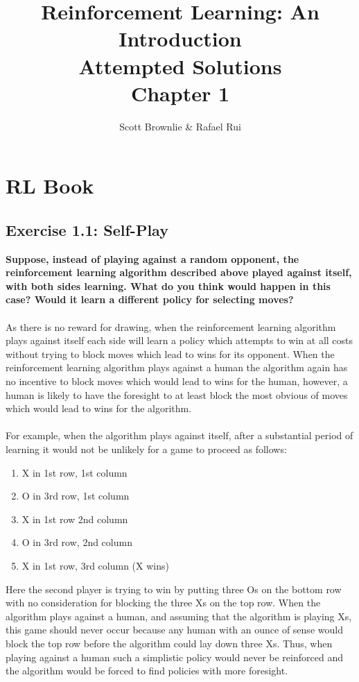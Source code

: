 \documentclass[a4paper,11pt]{article}
\title{Reinforcement Learning: An Introduction \\ Attempted Solutions \\ Chapter 1}
\author{Scott Brownlie \& Rafael Rui}
\date{}
\numberwithin{equation}{section}
\theoremstyle{remark}
\begin{document}
\maketitle

\section{RL Book}

\subsection{Exercise 1.1: Self-Play}

\textbf{Suppose, instead of playing against a random opponent, the reinforcement learning algorithm described above played against itself, with both sides learning. What do you think would happen in this case? Would it learn a different policy for selecting moves?}
\\ \\
As there is no reward for drawing, when the reinforcement learning algorithm plays against itself each side will learn a policy which attempts to win at all costs without trying to block moves which lead to wins for its opponent. When the reinforcement learning algorithm plays against a human the algorithm again has no incentive to block moves which would lead to wins for the human, however, a human is likely to have the foresight to at least block the most obvious of moves which would lead to wins for the algorithm. 
\\ \\
For example, when the algorithm plays against itself, after a substantial period of learning it would not be unlikely for a game to proceed as follows: 
\begin{enumerate}
	\item X in 1st row, 1st column
	\item O in 3rd row, 1st column
	\item X in 1st row 2nd column
	\item O in 3rd row, 2nd column
	\item X in 1st row, 3rd column (X wins)	
\end{enumerate}
Here the second player is trying to win by putting three Os on the bottom row with no consideration for blocking the three Xs on the top row. When the algorithm plays against a human, and assuming that the algorithm is playing Xs, this game should never occur because any human with an ounce of sense would block the top row before the algorithm could lay down three Xs. Thus, when playing against a human such a simplistic policy would never be reinforced and the algorithm would be forced to find policies with more foresight. 
\end{document}
